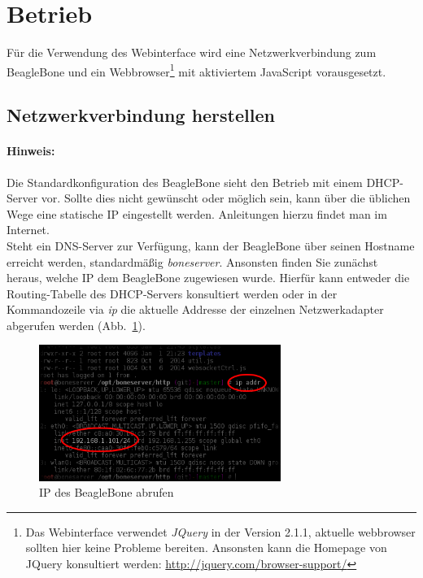 \section{Betrieb}
Für die Verwendung des Webinterface wird eine Netzwerkverbindung zum BeagleBone und ein Webbrowser\footnote{Das Webinterface verwendet \emph{JQuery} in der Version 2.1.1, aktuelle webbrowser sollten hier keine Probleme bereiten. Ansonsten kann die Homepage von JQuery konsultiert werden: \url{http://jquery.com/browser-support/}} mit aktiviertem JavaScript vorausgesetzt.


\subsection{Netzwerkverbindung herstellen}

\paragraph{Hinweis:} Die Standardkonfiguration des BeagleBone sieht den Betrieb mit einem DHCP-Server vor. Sollte dies nicht gewünscht oder möglich sein, kann über die üblichen Wege eine statische IP eingestellt werden. Anleitungen hierzu findet man im Internet.\\

Steht ein DNS-Server zur Verfügung, kann der BeagleBone über seinen Hostname erreicht werden, standardmäßig \textit{boneserver}. Ansonsten finden Sie zunächst heraus, welche IP dem BeagleBone zugewiesen wurde. Hierfür kann entweder die Routing-Tabelle des DHCP-Servers konsultiert werden oder in der Kommandozeile via \emph{ip} die aktuelle Addresse der einzelnen Netzwerkadapter abgerufen werden \mbox{(Abb. \ref{fig:getBeagleBoneIP})}.

\begin{figure}[ht]
	\centering
	\includegraphics[width=0.7\textwidth]{betriebsanleitung/images/getBeagleBoneIP.png}
	\caption{IP des BeagleBone abrufen}
	\label{fig:getBeagleBoneIP}
\end{figure}


